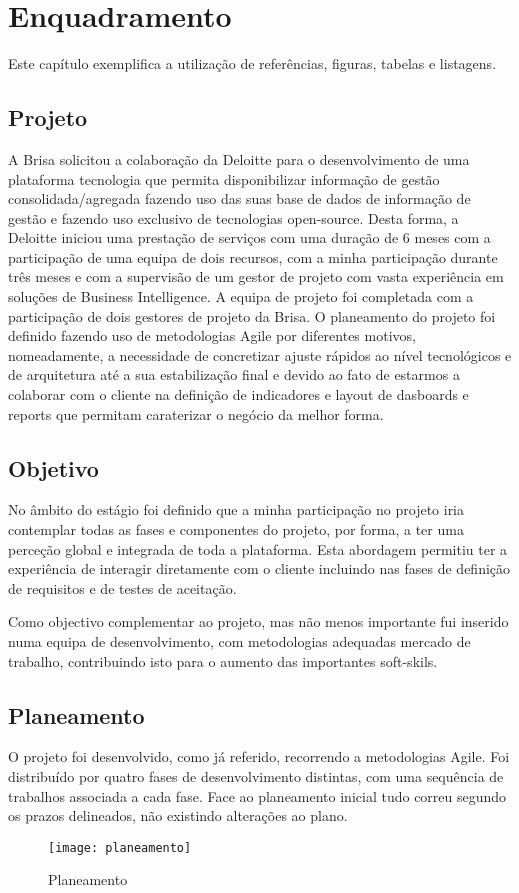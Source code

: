 \chapter{Enquadramento}
\label{cap2}

Este capítulo exemplifica a utilização de referências, figuras, tabelas e listagens.

\section{Projeto}
\par A Brisa solicitou a colaboração da Deloitte para o desenvolvimento de uma plataforma tecnologia que permita disponibilizar informação de gestão consolidada/agregada fazendo uso das suas base de dados de informação de gestão e fazendo uso exclusivo de tecnologias open-source. Desta forma, a Deloitte iniciou uma prestação de serviços com uma duração de 6 meses com a participação de uma equipa de dois recursos, com a minha participação durante três meses e com a supervisão de um gestor de projeto com vasta experiência em soluções de Business Intelligence. A equipa de projeto foi completada com a participação de dois gestores de projeto da Brisa. O planeamento do projeto foi definido fazendo uso de metodologias Agile por diferentes motivos, nomeadamente, a necessidade de concretizar ajuste rápidos ao nível tecnológicos e de arquitetura até a sua estabilização final e devido ao fato de estarmos a colaborar com o cliente na definição de indicadores e layout de dasboards e reports que permitam caraterizar o negócio da melhor forma.
\section{Objetivo}
\par No âmbito do estágio foi definido que a minha participação no projeto iria contemplar todas as fases e componentes do projeto, por forma, a ter uma perceção global e integrada de toda a plataforma. Esta abordagem permitiu ter a experiência de interagir diretamente com o cliente incluindo nas fases de definição de requisitos e de testes de aceitação. 
\par Como objectivo complementar ao projeto, mas não menos importante fui inserido numa equipa de desenvolvimento, com metodologias adequadas mercado de trabalho, contribuindo isto para o aumento das importantes soft-skils.
\section{Planeamento}
\par O projeto foi desenvolvido, como já referido, recorrendo a metodologias Agile. Foi distribuído por quatro fases de desenvolvimento distintas, com uma sequência de trabalhos associada a cada fase. Face ao planeamento inicial tudo correu segundo os prazos delineados, não existindo alterações ao plano. 
\begin{figure}[!htb]
\centering
\texttt{[image: planeamento]}
\caption{Planeamento}
\label{fig:planeamentoFig}
\end{figure}